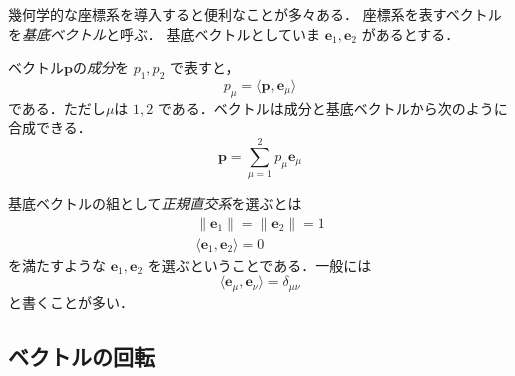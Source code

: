 \documentclass{jsbook}
\newcommand{\keyword}[1]{\emph{#1}}
\newcommand{\norm}[1]{\|{#1}\|}
\newcommand{\bvec}[1]{\boldsymbol{#1}}
\begin{document}
幾何学的な座標系を導入すると便利なことが多々ある．
座標系を表すベクトルを\keyword{基底ベクトル}と呼ぶ．
基底ベクトルとしていま $\bvec{e}_1,\bvec{e}_2$ があるとする．

ベクトル$\bvec{p}$の\keyword{成分}を $p_1,p_2$ で表すと，
\begin{equation}
p_\mu=\langle\bvec{p},\bvec{e}_\mu\rangle
\end{equation}
である．ただし$\mu$は $1,2$ である．ベクトルは成分と基底ベクトルから次のように合成できる．
\begin{equation}
\bvec{p}=\sum_{\mu=1}^2p_\mu\bvec{e}_\mu
\end{equation}

基底ベクトルの組として\keyword{正規直交系}を選ぶとは
\begin{gather}
\norm{\bvec{e}_1}=\norm{\bvec{e}_2}=1\\
\langle\bvec{e}_1,\bvec{e}_2\rangle=0
\end{gather}
を満たすような $\bvec{e}_1,\bvec{e}_2$ を選ぶということである．一般には
\begin{equation}
\langle\bvec{e}_\mu,\bvec{e}_\nu\rangle=\delta_{\mu\nu}
\end{equation}
と書くことが多い．

\subsection{ベクトルの回転}
\end{document}
